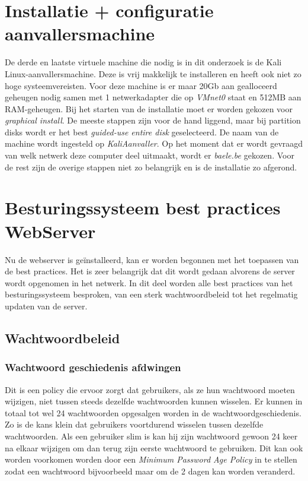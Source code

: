 \documentclass[pdftex,a4paper,12pt]{report}
\begin{document}
\section{Installatie + configuratie aanvallersmachine}
De derde en laatste virtuele machine die nodig is in dit onderzoek is de Kali Linux-aanvallersmachine. Deze is vrij makkelijk te installeren en heeft ook niet zo hoge systeemvereisten. Voor deze machine is er maar 20Gb aan gealloceerd geheugen nodig samen met 1 netwerkadapter die op \textit{VMnet0} staat en 512MB aan RAM-geheugen. Bij het starten van de installatie moet er worden gekozen voor \textit{graphical install}. De meeste stappen zijn voor de hand liggend, maar bij partition disks wordt er het best \textit{guided-use entire disk} geselecteerd. De naam van de machine wordt ingesteld op \textit{KaliAanvaller}. Op het moment dat er wordt gevraagd van welk netwerk deze computer deel uitmaakt, wordt er \textit{baele.be} gekozen. Voor de rest zijn de overige stappen niet zo belangrijk en is de installatie zo afgerond.

\section{Besturingssysteem best practices WebServer}
Nu de webserver is geïnstalleerd, kan er worden begonnen met het toepassen van de best practices. Het is zeer belangrijk dat dit wordt gedaan alvorens de server wordt opgenomen in het netwerk. In dit deel worden alle best practices van het besturingssysteem besproken, van een sterk wachtwoordbeleid tot het regelmatig updaten van de server.

\subsection{Wachtwoordbeleid}
\subsubsection{Wachtwoord geschiedenis afdwingen}
Dit is een policy die ervoor zorgt dat gebruikers, als ze hun wachtwoord moeten wijzigen, niet tussen steeds dezelfde wachtwoorden kunnen wisselen. Er kunnen in totaal tot wel 24 wachtwoorden opgesalgen worden in de wachtwoordgeschiedenis. Zo is de kans klein dat gebruikers voortdurend wisselen tussen dezelfde wachtwoorden. Als een gebruiker slim is kan hij zijn wachtwoord gewoon 24 keer na elkaar wijzigen om dan terug zijn eerste wachtwoord te gebruiken. Dit kan ook worden voorkomen worden door een \textit{Minimum Password Age Policy} in te stellen zodat een wachtwoord bijvoorbeeld maar om de 2 dagen kan worden veranderd. \citep{Stanek2009} \newline
\end{document}
